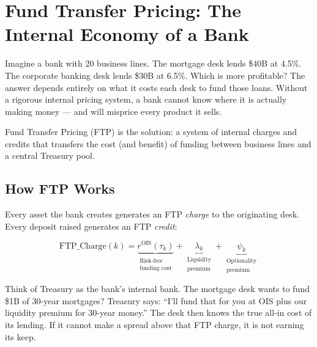 \documentclass[12pt,a4paper]{article}
\begin{document}
\section{Fund Transfer Pricing: The Internal Economy of a Bank}

Imagine a bank with 20 business lines.  The mortgage desk lends \$40B at
4.5\%.  The corporate banking desk lends \$30B at 6.5\%.  Which is more
profitable?  The answer depends entirely on what it costs each desk to fund
those loans.  Without a rigorous internal pricing system, a bank cannot know
where it is actually making money --- and will misprice every product it sells.

Fund Transfer Pricing (FTP) is the solution: a system of internal charges and
credits that transfers the cost (and benefit) of funding between business
lines and a central Treasury pool.

\subsection{How FTP Works}

Every asset the bank creates generates an FTP \emph{charge} to the originating
desk.  Every deposit raised generates an FTP \emph{credit}:

\begin{equation}
  \text{FTP\_Charge}(k) = \underbrace{r^{\text{OIS}}(\tau_k)}_{\substack{\text{Risk-free}\\\text{funding cost}}}
                        + \underbrace{\lambda_k}_{\substack{\text{Liquidity}\\\text{premium}}}
                        + \underbrace{\psi_k}_{\substack{\text{Optionality}\\\text{premium}}}
\end{equation}

\begin{mdframed}[style=analogy]
Think of Treasury as the bank's internal bank.  The mortgage desk wants to
fund \$1B of 30-year mortgages?  Treasury says: ``I'll fund that for you at
OIS plus our liquidity premium for 30-year money.''  The desk then knows the
true all-in cost of its lending.  If it cannot make a spread above that FTP
charge, it is not earning its keep.
\end{mdframed}
\end{document}
